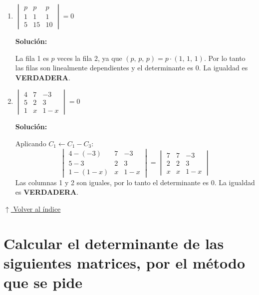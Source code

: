 \documentclass[12pt]{article}
\newcommand{\solucion}{%
    \vspace{0.8em}%
    \textbf{Solución:}%
}
\newcommand{\volverindice}{%
    \vspace{1em}%
    \begin{flushright}%
        \hyperlink{indice}{\small $\uparrow$ Volver al índice}%
    \end{flushright}%
}
\begin{document}
\begin{enumerate}[label=\alph*.-]
    \solucion

    Aplicando $C_1 \leftarrow C_1 + C_3$ en el determinante de la izquierda:
    \[
    \begin{vmatrix}a-b+b&1&b\\b-c+c&1&c\\c-a+a&1&a\end{vmatrix}
    =\begin{vmatrix}a&1&b\\b&1&c\\c&1&a\end{vmatrix}
    \]
    Esta es exactamente la expresión del lado derecho.
    La igualdad es \textbf{VERDADERA}.

    \newpage
    \item $\begin{vmatrix} p & p & p \\ 1 & 1 & 1 \\ 5 & 15 & 10 \end{vmatrix} = 0$

    \solucion

    La fila 1 es $p$ veces la fila 2, ya que $(p,\,p,\,p) = p\cdot(1,\,1,\,1)$.
    Por lo tanto las filas son linealmente dependientes y el determinante es $0$.
    La igualdad es \textbf{VERDADERA}.

    \item $\begin{vmatrix} 4 & 7 & -3 \\ 5 & 2 & 3 \\ 1 & x & 1-x \end{vmatrix} = 0$

    \solucion

    Aplicando $C_1 \leftarrow C_1 - C_3$:
    \[
    \begin{vmatrix}4-(-3)&7&-3\\5-3&2&3\\1-(1-x)&x&1-x\end{vmatrix}
    =\begin{vmatrix}7&7&-3\\2&2&3\\x&x&1-x\end{vmatrix}
    \]
    Las columnas 1 y 2 son iguales, por lo tanto el determinante es $0$.
    La igualdad es \textbf{VERDADERA}.
\end{enumerate}

\volverindice
\newpage

\section{Calcular el determinante de las siguientes matrices, por el método que se pide}
\end{document}
